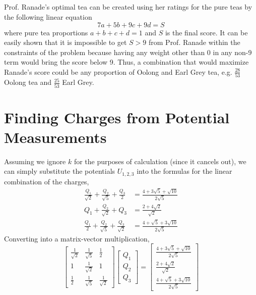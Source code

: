 \documentclass[]{article}
\begin{document}
\subsection{}

Prof. Ranade's optimal tea can be created using her ratings for the pure teas by the following linear equation
\begin{equation}
	7a + 5b + 9c + 9d = S
\end{equation}
where pure tea proportions \(a + b + c + d = 1\) and \(S\) is the final score. It can be easily shown that it is impossible to get \(S > 9\) from Prof. Ranade within the constraints of the problem because having any weight other than 0 in any non-9 term would bring the score below 9. Thus, a combination that would maximize Ranade's score could be any proportion of Oolong and Earl Grey tea, e.g. \(\frac{28}{53}\) Oolong tea and \(\frac{25}{53}\) Earl Grey. 

\section{Finding Charges from Potential Measurements}

Assuming we ignore \(k\) for the purposes of calculation (since it cancels out), we can simply substitute the potentials \(U_{1,2,3}\) into the formulas for the linear combination of the charges, 
\begin{align}
	\frac{Q_1}{\sqrt{2}} + \frac{Q_2}{\sqrt{5}} + \frac{Q_3}{2} &= \frac{4 + 3\sqrt{5} + \sqrt{10}}{2 \sqrt{5}} \\
	Q_1 + \frac{Q_2}{\sqrt{2}} + Q_3 &= \frac{2 + 4 \sqrt{2}}{\sqrt{2}} \\
	\frac{Q_1}{2} + \frac{Q_2}{\sqrt{5}} + \frac{Q_3}{\sqrt{2}} &= \frac{4 + \sqrt{5} + 3\sqrt{10}}{2 \sqrt{5}}
\end{align}
Converting into a matrix-vector multiplication, 
\begin{equation}
	\begin{bmatrix}
	\frac{1}{\sqrt{2}} & \frac{1}{\sqrt{5}} & \frac{1}{2} \\
	1 & \frac{1}{\sqrt{2}} & 1 \\
	\frac{1}{2} & \frac{1}{\sqrt{5}} & \frac{1}{\sqrt{2}}
	\end{bmatrix}
	\begin{bmatrix}
	Q_1 \\
	Q_2 \\
	Q_3
	\end{bmatrix}
	=
	\begin{bmatrix}
	\frac{4 + 3\sqrt{5} + \sqrt{10}}{2 \sqrt{5}} \\
	\frac{2 + 4 \sqrt{2}}{\sqrt{2}} \\
	\frac{4 + \sqrt{5} + 3\sqrt{10}}{2 \sqrt{5}}
	\end{bmatrix}
\end{equation}
\end{document}
